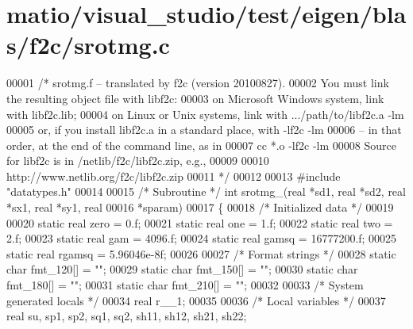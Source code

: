 \hypertarget{matio_2visual__studio_2test_2eigen_2blas_2f2c_2srotmg_8c_source}{}\section{matio/visual\+\_\+studio/test/eigen/blas/f2c/srotmg.c}
\label{matio_2visual__studio_2test_2eigen_2blas_2f2c_2srotmg_8c_source}

\begin{DoxyCode}
00001 \textcolor{comment}{/* srotmg.f -- translated by f2c (version 20100827).}
00002 \textcolor{comment}{   You must link the resulting object file with libf2c:}
00003 \textcolor{comment}{    on Microsoft Windows system, link with libf2c.lib;}
00004 \textcolor{comment}{    on Linux or Unix systems, link with .../path/to/libf2c.a -lm}
00005 \textcolor{comment}{    or, if you install libf2c.a in a standard place, with -lf2c -lm}
00006 \textcolor{comment}{    -- in that order, at the end of the command line, as in}
00007 \textcolor{comment}{        cc *.o -lf2c -lm}
00008 \textcolor{comment}{    Source for libf2c is in /netlib/f2c/libf2c.zip, e.g.,}
00009 \textcolor{comment}{}
00010 \textcolor{comment}{        http://www.netlib.org/f2c/libf2c.zip}
00011 \textcolor{comment}{*/}
00012 
00013 \textcolor{preprocessor}{#include "datatypes.h"}
00014 
00015 \textcolor{comment}{/* Subroutine */} \textcolor{keywordtype}{int} srotmg\_(real *sd1, real *sd2, real *sx1, real *sy1, real 
00016     *sparam)
00017 \{
00018     \textcolor{comment}{/* Initialized data */}
00019 
00020     \textcolor{keyword}{static} real zero = 0.f;
00021     \textcolor{keyword}{static} real one = 1.f;
00022     \textcolor{keyword}{static} real two = 2.f;
00023     \textcolor{keyword}{static} real gam = 4096.f;
00024     \textcolor{keyword}{static} real gamsq = 16777200.f;
00025     \textcolor{keyword}{static} real rgamsq = 5.96046e-8f;
00026 
00027     \textcolor{comment}{/* Format strings */}
00028     \textcolor{keyword}{static} \textcolor{keywordtype}{char} fmt\_120[] = \textcolor{stringliteral}{""};
00029     \textcolor{keyword}{static} \textcolor{keywordtype}{char} fmt\_150[] = \textcolor{stringliteral}{""};
00030     \textcolor{keyword}{static} \textcolor{keywordtype}{char} fmt\_180[] = \textcolor{stringliteral}{""};
00031     \textcolor{keyword}{static} \textcolor{keywordtype}{char} fmt\_210[] = \textcolor{stringliteral}{""};
00032 
00033     \textcolor{comment}{/* System generated locals */}
00034     real r\_\_1;
00035 
00036     \textcolor{comment}{/* Local variables */}
00037     real su, sp1, sp2, sq1, sq2, sh11, sh12, sh21, sh22;

\end{DoxyCode}
